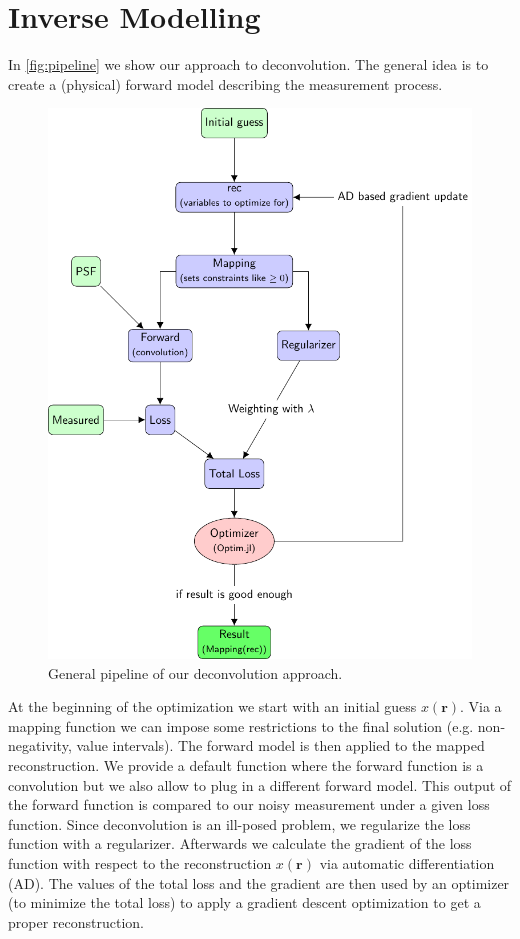 \documentclass{juliacon}
\begin{document}
\section{Inverse Modelling}
In \autoref{fig:pipeline} we show our approach to deconvolution.
The general idea is to create a (physical) forward model describing the measurement process.
\begin{figure}[h]
    \centering
    \includegraphics[width = .4\textwidth]{figures/pipeline.pdf}
    \caption{General pipeline of our deconvolution approach.}
    \label{fig:pipeline}
\end{figure}

At the beginning of the optimization we start with an initial guess $x(\mathbf r)$. 
Via a mapping function we can impose some restrictions to the final solution (e.g. non-negativity, value intervals).
The forward model is then applied to the mapped reconstruction. We provide a default function where 
the forward function is a convolution but we also allow to plug in a different forward model.
This output of the forward function is compared
to our noisy measurement under a given loss function.
Since deconvolution is an ill-posed problem, we regularize the loss function with a regularizer.
Afterwards we calculate the gradient of the loss function with respect to the reconstruction $x(\mathbf r)$ via automatic differentiation (AD).
The values of the total loss and the gradient are then used by an optimizer (to minimize the total loss) to apply a gradient descent optimization to get a proper reconstruction.\\
\end{document}
